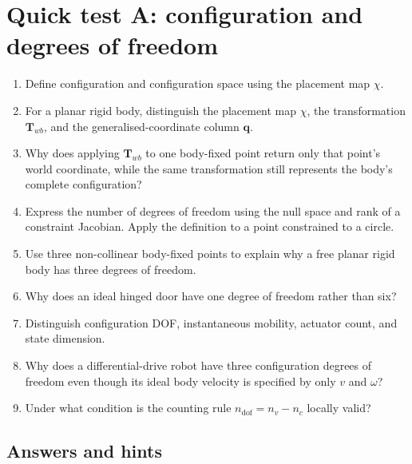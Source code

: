 \documentclass[
  australian,
  12pt,
  letterpaper,
  DIV=11,
  numbers=noendperiod,
  twoside]{scrreprt}
\providecommand{\tightlist}{%
  \setlength{\itemsep}{0pt}\setlength{\parskip}{0pt}}
\begin{document}
\section*{Quick test A: configuration and degrees of
freedom}\label{quick-test-a-configuration-and-degrees-of-freedom}


\begin{enumerate}
\def\labelenumi{\arabic{enumi}.}
\tightlist
\item
  Define configuration and configuration space using the placement map
  \(\chi\).
\item
  For a planar rigid body, distinguish the placement map \(\chi\), the
  transformation \(\mathbf T_{wb}\), and the generalised-coordinate
  column \(\mathbf q\).
\item
  Why does applying \(\mathbf T_{wb}\) to one body-fixed point return
  only that point's world coordinate, while the same transformation
  still represents the body's complete configuration?
\item
  Express the number of degrees of freedom using the null space and rank
  of a constraint Jacobian. Apply the definition to a point constrained
  to a circle.
\item
  Use three non-collinear body-fixed points to explain why a free planar
  rigid body has three degrees of freedom.
\item
  Why does an ideal hinged door have one degree of freedom rather than
  six?
\item
  Distinguish configuration DOF, instantaneous mobility, actuator count,
  and state dimension.
\item
  Why does a differential-drive robot have three configuration degrees
  of freedom even though its ideal body velocity is specified by only
  \(v\) and \(\omega\)?
\item
  Under what condition is the counting rule \(n_{\mathrm{dof}}=n_v-n_c\)
  locally valid?
\end{enumerate}

\subsection*{Answers and hints}\label{answers-and-hints-15}
\end{document}

